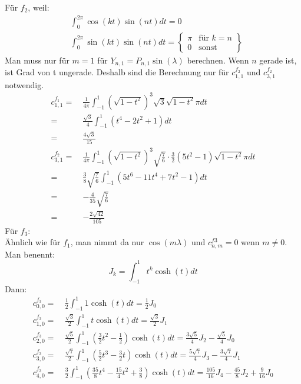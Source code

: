 Für $f_2$, weil:
\begin{align}
	& \int_{0}^{2\pi}\cos(kt)\sin(nt)dt = 0 \\
	& \int_{0}^{2\pi}\sin(kt)\sin(nt)dt = \begin{Bmatrix}
	\pi & \text{für  } k=n \\
	0 &\text{sonst}
	\end{Bmatrix}
\end{align}
Man muss nur für $m=1$ für $Y_{n,1} = P_{n,1}\sin(\lambda)$ berechnen. Wenn $n$ gerade ist, ist Grad von t ungerade. Deshalb sind die Berechnung nur für $c_{1,1}^{f_2}$ und $c_{3,1}^{f_2}$ notwendig.
\begin{align}
	c_{1,1}^{f_1} = \ & \frac{1}{4\pi}\int_{-1}^{1}(\sqrt{1-t^2})^3\sqrt{3}\sqrt{1-t^2}\pi dt\\
	= \ & \frac{\sqrt{3}}{4} \int_{-1}^{1} (t^4 - 2t^2 +1)dt \\
	= \ & \frac{4\sqrt{3}}{15} \\
	c_{3,1}^{f_2} = \ & \frac{1}{4\pi}\int_{-1}^{1}(\sqrt{1-t^2})^3\sqrt{\frac{7}{6}}\cdot \frac{3}{2}(5t^2-1)\sqrt{1-t^2} \pi dt \\
	= \ & \frac{3}{8}\sqrt{\frac{7}{6}}\int_{-1}^{1}(5t^6 - 11t^4 + 7t^2-1) dt \\
	= \ & -\frac{4}{35} \sqrt{\frac{7}{6}} \\ 
	= \ & -\frac{2\sqrt{42}}{105}
\end{align}
Für $f_3$:\\
Ähnlich wie für $f_1$, man nimmt da nur $\cos(m\lambda)$ und $c_{n,m}^{f3} = 0$ wenn $m \neq 0$. Man benennt:
\begin{equation*}
	J_k = \int_{-1}^{1} t^k \cosh (t) dt
\end{equation*}
Dann:
\begin{align}
	c_{0,0}^{f_3} = \ & \frac{1}{2} \int_{-1}^{1} 1 \cosh (t) dt = \frac{1}{2} J_0 \\
	c_{1,0}^{f_3} = \ & \frac{\sqrt{3}}{2} \int_{-1}^{1} t \cosh (t) dt = \frac{\sqrt{3}}{2}J_1 \\
	c_{2,0}^{f_3} = \ & \frac{\sqrt{5}}{2} \int_{-1}^{1} (\frac{3}{2}t^2-\frac{1}{2})\cosh (t) dt = \frac{3\sqrt{5}}{4}J_2-\frac{\sqrt{5}}{4} J_0 \\
	c_{3,0}^{f_3} = \ & \frac{\sqrt{7}}{2} \int_{-1}^{1} (\frac{5}{2}t^3 - \frac{3}{2}t)\cosh (t) dt = \frac{5\sqrt{7}}{4}J_3 - \frac{3\sqrt{7}}{4} J_1 \\
	c_{4,0}^{f_3} = \ & \frac{3}{2} \int_{-1}^{1} (\frac{35}{8}t^4 - \frac{15}{4}t^2 + \frac{3}{8}) \cosh (t) dt = \frac{105}{16}J_4 - \frac{45}{8}J_2 + \frac{9}{16}J_0 \\
\end{align}
